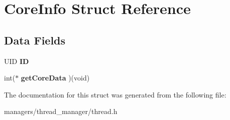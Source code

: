 \hypertarget{structCoreInfo}{}\section{Core\+Info Struct Reference}
\label{structCoreInfo}
\subsection*{Data Fields}
\begin{DoxyCompactItemize}
\item 
U\+ID {\bfseries ID}\hypertarget{structCoreInfo_a01e11fbcb7e192a95a30ba90840a0a70}{}\label{structCoreInfo_a01e11fbcb7e192a95a30ba90840a0a70}

\item 
int($\ast$ {\bfseries get\+Core\+Data} )(void)\hypertarget{structCoreInfo_a235c5e7eaf89c2932a0615a7d17281ef}{}\label{structCoreInfo_a235c5e7eaf89c2932a0615a7d17281ef}

\end{DoxyCompactItemize}


The documentation for this struct was generated from the following file\+:\begin{DoxyCompactItemize}
\item 
managers/thread\+\_\+manager/thread.\+h\end{DoxyCompactItemize}
